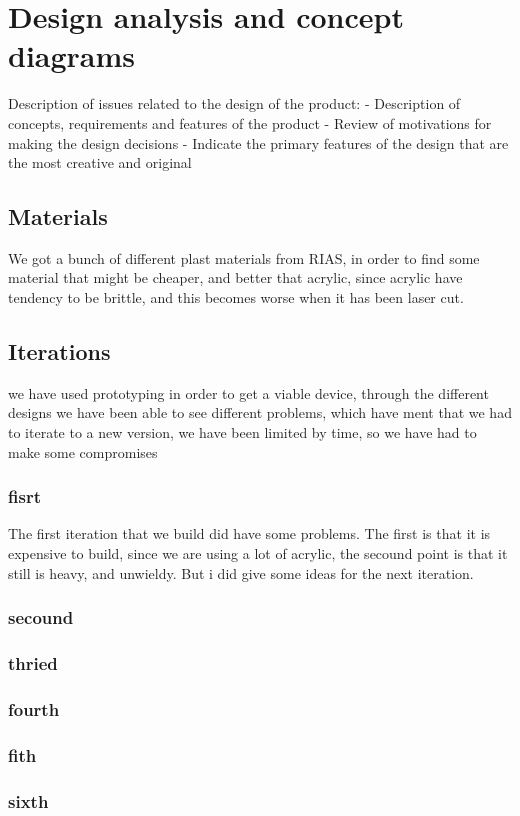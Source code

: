 \section{Design analysis and concept diagrams}
Description of issues related to the design of the product:
- Description of concepts, requirements and features of the product
- Review of motivations for making the design decisions
- Indicate the primary features of the design that are the most creative and original

\subsection{Materials}
We got a bunch of different plast materials from RIAS, in order to find some material that might be cheaper, and better that acrylic, since acrylic have tendency to be brittle, and this becomes worse when it has been laser cut. 

\subsection{Iterations}
we have used prototyping in order to get a viable device, through the different designs we have been able to see different problems, which have ment that we had to iterate to a new version, we have been limited by time, so we have had to make some compromises

\subsubsection{fisrt}
The first iteration that we build did have some problems.
The first is that it is expensive to build, since we are using a lot of acrylic, the secound point is that it still is heavy, and unwieldy.
But i did give some ideas for the next iteration.

\subsubsection{secound}


\subsubsection{thried}


\subsubsection{fourth}


\subsubsection{fith}

\subsubsection{sixth}

